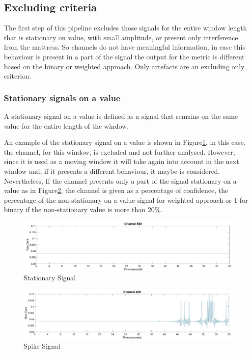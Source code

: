 \subsection{Excluding criteria}\label{cap:excCrit}
The first step of this pipeline excludes those signals for the entire window length that is stationary on value, with small amplitude, or present only interference from the mattress. So channels do not have meaningful information, in case this behaviour is present in a part of the signal the output for the metric is different based on the binary or weighted approach. Only artefacts are an excluding only criterion.

\subsubsection*{Stationary signals on a value}\label{cap:stationary}
A stationary signal on a value is defined as a signal that remains on the same value for the entire length of the window.

An example of the stationary signal on a value is shown in Figure\ref{fig:stationaryTotal}, in this case, the channel, for this window, is excluded and not further analysed.
However, since it is used as a moving window it will take again into account in the next window and, if it presents a different behaviour, it maybe is considered. 
Nevertheless, If the channel presents only a part of the signal stationary on a value as in Figure\ref{fig:spikePartial}, the channel is given as a percentage of confidence, the percentage of the non-stationary on a value signal for weighted approach or 1 for binary if the non-stationary value is more than 20\%.
\vspace*{0.5cm}
\begin{figure}[H]
    \centering
    \includegraphics[width=\textwidth]{img/stationaryTotal.jpg}
    \caption{Stationary Signal}
    \label{fig:stationaryTotal}
\end{figure}

\begin{figure}[H]
    \centering
    \includegraphics[width=\textwidth]{img/spakePartial.jpg}
    \caption{Spike Signal}
    \label{fig:spikePartial}
\end{figure}

